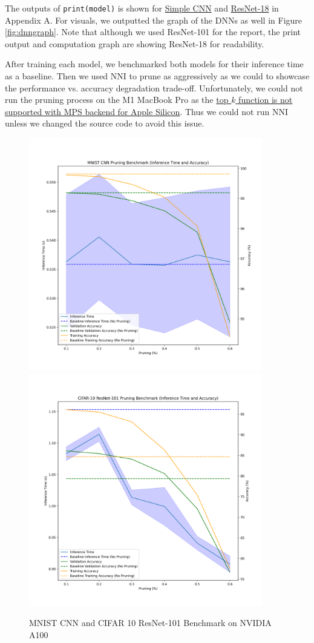 \documentclass{article}
\begin{document}
The outputs of \verb|print(model)| is shown for \hyperref[sec:A1]{Simple CNN} and \hyperref[sec:A2]{ResNet-18} in Appendix A. For visuals, we outputted the graph of the DNNs as well in Figure \ref{fig:dnngraph}. Note that although we used ResNet-101 for the report, the print output and computation graph are showing ResNet-18 for readability.

After training each model, we benchmarked both models for their inference time as a baseline. Then we used NNI to prune as aggressively as we could to showcase the performance vs. accuracy degradation trade-off. Unfortunately, we could not run the pruning process on the M1 MacBook Pro as the \href{https://github.com/pytorch/pytorch/issues/78915}{top $k$ function is not supported with MPS backend for Apple Silicon}. Thus we could not run NNI unless we changed the source code to avoid this issue.

\begin{figure}
    \centerline{
        \includegraphics[width=4in]{../proj1/figures/mnist_cnn_benchmark.png}
        \includegraphics[width=4in]{../proj1/figures/resnet101_benchmark.png}
    }
    \caption{MNIST CNN and CIFAR 10 ResNet-101 Benchmark on NVIDIA A100}
    \label{fig:a100benchmark}
\end{figure}
\end{document}
